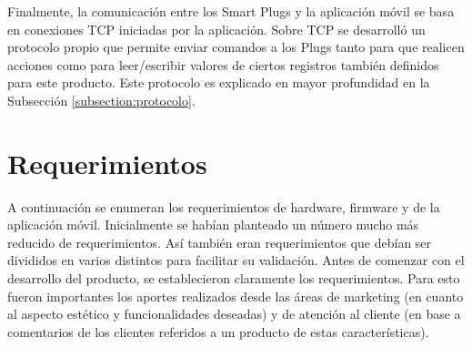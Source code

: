 Finalmente, la comunicación entre los Smart Plugs y la aplicación móvil se basa en conexiones TCP iniciadas por la aplicación. Sobre TCP se desarrolló un protocolo propio que permite enviar comandos a los Plugs tanto para que realicen acciones como para leer/escribir valores de ciertos registros también definidos para este producto. Este protocolo es explicado en mayor profundidad en la Subsección \ref{subsection:protocolo}.



\section{Requerimientos}
\label{sec:requerimientos}

A continuación se enumeran los requerimientos de hardware, firmware y de la aplicación móvil. Inicialmente se habían planteado un número mucho más reducido de requerimientos. Así también eran requerimientos que debían ser divididos en varios distintos para facilitar su validación. Antes de comenzar con el desarrollo del producto, se establecieron claramente los requerimientos. Para esto fueron importantes los aportes realizados desde las áreas de marketing (en cuanto al aspecto estético y funcionalidades deseadas) y de atención al cliente (en base a comentarios de los clientes referidos a un producto de estas características).

